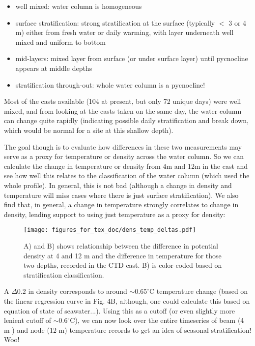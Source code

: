 \documentclass[11pt]{article}
\begin{document}
\begin{itemize}

\item well mixed: water column is homogeneous
\item surface stratification: strong stratification at the surface (typically $<$ 3 or 4 m) either from fresh water or daily warming, with layer underneath well mixed and uniform to bottom
\item mid-layers: mixed layer from surface (or under surface layer) until pycnocline appears at middle depths 
\item stratification through-out: whole water column is a pycnocline!
\end{itemize}

Most of the casts available (104 at present, but only 72 unique days) were well mixed, and from looking at the casts taken on the same day, the water column can change quite rapidly (indicating possible daily stratification and break down, which would be normal for a site at this shallow depth). 

 The  goal though is to evaluate how differences in these two measurements may serve as a proxy for temperature or density across the water column. So we can calculate the change in temperature or density from 4m and 12m in the cast and see how well this relates to the classification of the water column (which used the whole profile). In general, this is not bad (although a change in density and temperature will miss cases where there is just surface stratification). We also find that, in general, a change in temperature strongly correlates to change in density, lending support to using just temperature as a proxy for density:

 \begin{figure}[h]
\centering
\texttt{[image: figures\_for\_tex\_doc/dens\_temp\_deltas.pdf]}
\caption{A) and B) shows relationship between the difference in potential density at 4 and 12 m and the difference in temperature for those two depths, recorded in the CTD cast. B) is color-coded based on stratification classification.}
\end{figure}


\noindent A $\Delta0.2$ in density corresponds to around $\sim0.65 ^{\circ}$C temperature change (based on the linear regression curve in Fig. 4B, although, one could calculate this based on equation of state of seawater...). Using this as a cutoff (or even slightly more lenient cutoff of $\sim0.6 ^{\circ}$C), we can now look over the entire timeseries of beam (4 m ) and node (12 m) temperature records to get an idea of seasonal stratification! Woo!
\end{document}

